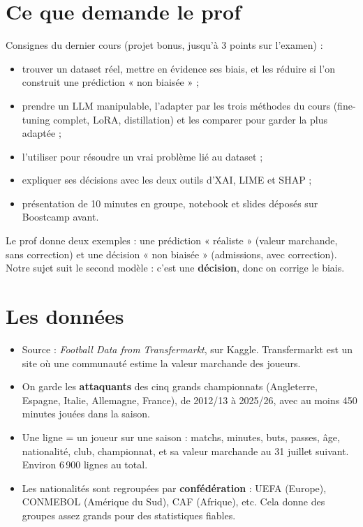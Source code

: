 \documentclass[11pt,a4paper]{article}
\begin{document}
\section{Ce que demande le prof}
Consignes du dernier cours (projet bonus, jusqu'à 3 points sur l'examen) :
\begin{itemize}
  \item trouver un dataset réel, mettre en évidence ses biais, et les réduire si l'on construit une prédiction « non biaisée » ;
  \item prendre un LLM manipulable, l'adapter par les trois méthodes du cours (fine-tuning complet, LoRA, distillation) et les comparer pour garder la plus adaptée ;
  \item l'utiliser pour résoudre un vrai problème lié au dataset ;
  \item expliquer ses décisions avec les deux outils d'XAI, LIME et SHAP ;
  \item présentation de 10 minutes en groupe, notebook et slides déposés sur Boostcamp avant.
\end{itemize}
Le prof donne deux exemples : une prédiction « réaliste » (valeur marchande, sans correction) et une décision « non biaisée » (admissions, avec correction). Notre sujet suit le second modèle : c'est une \textbf{décision}, donc on corrige le biais.

\section{Les données}
\begin{itemize}
  \item Source : \emph{Football Data from Transfermarkt}, sur Kaggle. Transfermarkt est un site où une communauté estime la valeur marchande des joueurs.
  \item On garde les \textbf{attaquants} des cinq grands championnats (Angleterre, Espagne, Italie, Allemagne, France), de 2012/13 à 2025/26, avec au moins 450 minutes jouées dans la saison.
  \item Une ligne = un joueur sur une saison : matchs, minutes, buts, passes, âge, nationalité, club, championnat, et sa valeur marchande au 31 juillet suivant. Environ 6\,900 lignes au total.
  \item Les nationalités sont regroupées par \textbf{confédération} : UEFA (Europe), CONMEBOL (Amérique du Sud), CAF (Afrique), etc. Cela donne des groupes assez grands pour des statistiques fiables.
\end{itemize}
\end{document}
